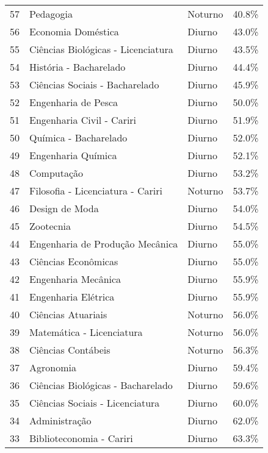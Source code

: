 \begin{tabular}{llll}
57 &                           Pedagogia &  Noturno &   40.8\% \\
56 &                  Economia Doméstica &   Diurno &   43.0\% \\
55 &  Ciências Biológicas - Licenciatura &   Diurno &   43.5\% \\
54 &              História - Bacharelado &   Diurno &   44.4\% \\
53 &      Ciências Sociais - Bacharelado &   Diurno &   45.9\% \\
52 &                 Engenharia de Pesca &   Diurno &   50.0\% \\
51 &           Engenharia Civil - Cariri &   Diurno &   51.9\% \\
50 &               Química - Bacharelado &   Diurno &   52.0\% \\
49 &                  Engenharia Química &   Diurno &   52.1\% \\
48 &                          Computação &   Diurno &   53.2\% \\
47 &   Filosofia - Licenciatura - Cariri &  Noturno &   53.7\% \\
46 &                      Design de Moda &   Diurno &   54.0\% \\
45 &                           Zootecnia &   Diurno &   54.5\% \\
44 &     Engenharia de Produção Mecânica &   Diurno &   55.0\% \\
43 &                 Ciências Econômicas &   Diurno &   55.0\% \\
42 &                 Engenharia Mecânica &   Diurno &   55.9\% \\
41 &                 Engenharia Elétrica &   Diurno &   55.9\% \\
40 &                  Ciências Atuariais &  Noturno &   56.0\% \\
39 &           Matemática - Licenciatura &  Noturno &   56.0\% \\
38 &                  Ciências Contábeis &  Noturno &   56.3\% \\
37 &                           Agronomia &   Diurno &   59.4\% \\
36 &   Ciências Biológicas - Bacharelado &   Diurno &   59.6\% \\
35 &     Ciências Sociais - Licenciatura &   Diurno &   60.0\% \\
34 &                       Administração &   Diurno &   62.0\% \\
33 &            Biblioteconomia - Cariri &   Diurno &   63.3\% \\

\end{tabular}
